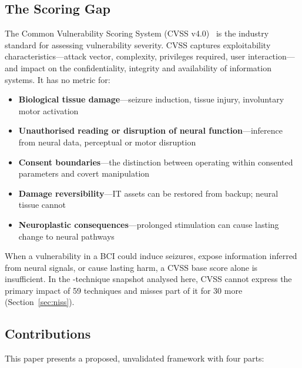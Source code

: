 \subsection{The Scoring Gap}

The Common Vulnerability Scoring System (CVSS v4.0)~\cite{first2023cvss4} is the
industry standard for assessing vulnerability severity. CVSS captures exploitability
characteristics---attack vector, complexity, privileges required, user
interaction---and impact on the confidentiality, integrity and availability of
information systems. It has no metric for:

\begin{itemize}
  \item \textbf{Biological tissue damage}---seizure induction, tissue injury,
        involuntary motor activation
  \item \textbf{Unauthorised reading or disruption of neural function}---inference
        from neural data, perceptual or motor disruption
  \item \textbf{Consent boundaries}---the distinction between operating within
        consented parameters and covert manipulation
  \item \textbf{Damage reversibility}---IT assets can be restored from backup;
        neural tissue cannot
  \item \textbf{Neuroplastic consequences}---prolonged stimulation can cause
        lasting change to neural pathways
\end{itemize}

When a vulnerability in a BCI could induce seizures, expose information inferred from
neural signals, or cause lasting harm, a CVSS base score alone is insufficient. In the
\SnapshotTechniques{}-technique snapshot analysed here, CVSS cannot express the primary
impact of 59 techniques and misses part of it for 30 more (Section~\ref{sec:niss}).

\subsection{Contributions}

This paper presents a proposed, unvalidated framework with four parts:

